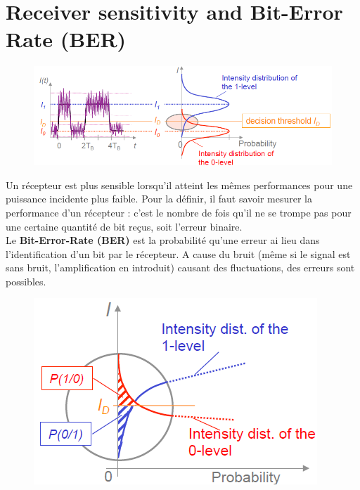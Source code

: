 \newpage
\section{Receiver sensitivity and Bit-Error Rate (BER)}
\begin{figure}
\vspace{-7mm}
\includegraphics[scale=0.5]{ch5/image17}
\end{figure}
Un récepteur est plus sensible lorsqu'il atteint les mêmes performances pour une puissance incidente
plus faible. Pour la définir, il faut savoir mesurer la performance d'un récepteur : c'est le nombre
de fois qu'il ne se trompe pas pour une certaine quantité de bit reçus, soit l'erreur binaire.\\

Le \textbf{Bit-Error-Rate (BER)} est la probabilité qu'une erreur ai lieu dans l'identification d'un
bit par le récepteur. A cause du bruit (même si le signal est sans bruit, l'amplification en 
introduit) causant des fluctuations, des erreurs sont possibles.\\

\begin{figure}
\vspace{-9mm}
\includegraphics[scale=0.5]{ch5/image18}
\end{figure}

